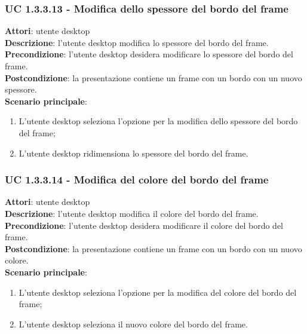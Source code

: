 \subsubsection{UC 1.3.3.13 - Modifica dello spessore del bordo del frame}{
	\label{uc1.3.3.13}
	\textbf{Attori}: utente desktop \\
	\textbf{Descrizione}: l'utente desktop modifica lo spessore del bordo del frame. \\
	\textbf{Precondizione}: l'utente desktop desidera modificare lo spessore del bordo del frame.	\\
	\textbf{Postcondizione}: la presentazione contiene un frame con un bordo con un nuovo spessore.	\\
	\textbf{Scenario principale}:
	\begin{enumerate}
		\item L'utente desktop seleziona l'opzione per la modifica dello spessore del bordo del frame;
		\item L'utente desktop ridimensiona lo spessore del bordo del frame.
	\end{enumerate}
	}
\subsubsection{UC 1.3.3.14 - Modifica del colore del bordo del frame}{
	\label{uc1.3.3.14}
	\textbf{Attori}: utente desktop \\
	\textbf{Descrizione}: l'utente desktop modifica il colore del bordo del frame. \\
	\textbf{Precondizione}: l'utente desktop desidera modificare il colore del bordo del frame.	\\
	\textbf{Postcondizione}: la presentazione contiene un frame con un bordo con un nuovo colore.	\\
	\textbf{Scenario principale}:
	\begin{enumerate}
		\item L'utente desktop seleziona l'opzione per la modifica del colore del bordo del frame;
		\item L'utente desktop seleziona il nuovo colore del bordo del frame.
	\end{enumerate}
	}
